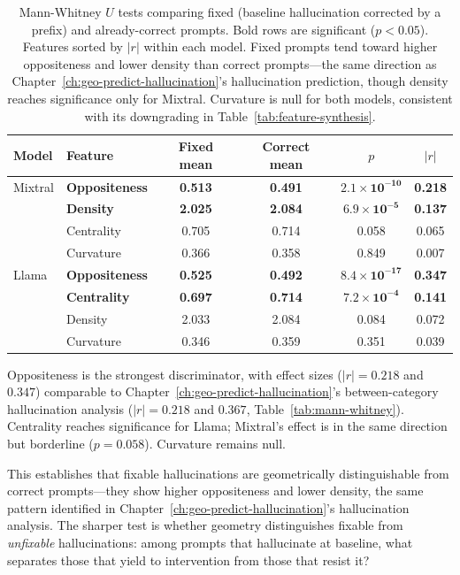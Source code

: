 \begin{table}[ht]
\centering
\small
\begin{tabular}{@{}llcccc@{}}
\toprule
\textbf{Model} & \textbf{Feature} & \textbf{Fixed mean} & \textbf{Correct mean} & $p$ & $|r|$ \\
\midrule
Mixtral & \textbf{Oppositeness} & \textbf{0.513} & \textbf{0.491} & $\boldsymbol{2.1 \times 10^{-10}}$ & \textbf{0.218} \\
        & \textbf{Density}      & \textbf{2.025} & \textbf{2.084} & $\boldsymbol{6.9 \times 10^{-5}}$ & \textbf{0.137} \\
        & Centrality   & 0.705 & 0.714 & 0.058 & 0.065 \\
        & Curvature    & 0.366 & 0.358 & 0.849 & 0.007 \\
\addlinespace
Llama   & \textbf{Oppositeness} & \textbf{0.525} & \textbf{0.492} & $\boldsymbol{8.4 \times 10^{-17}}$ & \textbf{0.347} \\
        & \textbf{Centrality}   & \textbf{0.697} & \textbf{0.714} & $\boldsymbol{7.2 \times 10^{-4}}$ & \textbf{0.141} \\
        & Density      & 2.033 & 2.084 & 0.084 & 0.072 \\
        & Curvature    & 0.346 & 0.359 & 0.351 & 0.039 \\
\bottomrule
\end{tabular}
\caption{Mann-Whitney $U$ tests comparing fixed (baseline hallucination corrected by a prefix) and already-correct prompts. Bold rows are significant ($p < 0.05$). Features sorted by $|r|$ within each model. Fixed prompts tend toward higher oppositeness and lower density than correct prompts---the same direction as Chapter~\ref{ch:geo-predict-hallucination}'s hallucination prediction, though density reaches significance only for Mixtral. Curvature is null for both models, consistent with its downgrading in Table~\ref{tab:feature-synthesis}.}
\label{tab:fixed-vs-correct}
\end{table}

Oppositeness is the strongest discriminator, with effect sizes ($|r| = 0.218$ and $0.347$) comparable to Chapter~\ref{ch:geo-predict-hallucination}'s between-category hallucination analysis ($|r| = 0.218$ and $0.367$, Table~\ref{tab:mann-whitney}). Centrality reaches significance for Llama; Mixtral's effect is in the same direction but borderline ($p = 0.058$). Curvature remains null.

This establishes that fixable hallucinations are geometrically distinguishable from correct prompts---they show higher oppositeness and lower density, the same pattern identified in Chapter~\ref{ch:geo-predict-hallucination}'s hallucination analysis. The sharper test is whether geometry distinguishes fixable from \emph{unfixable} hallucinations: among prompts that hallucinate at baseline, what separates those that yield to intervention from those that resist it?

